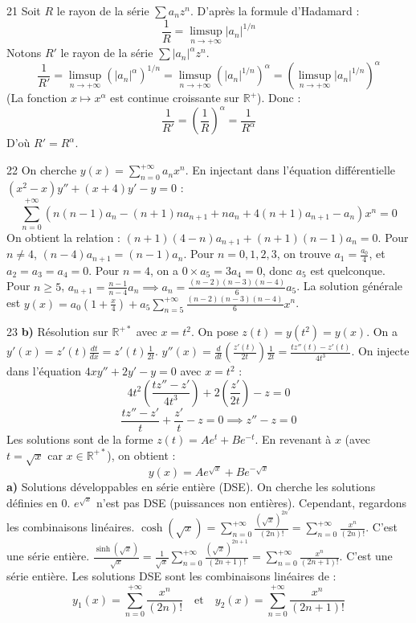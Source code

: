 \begin{correction}{21}
Soit $R$ le rayon de la série $\sum a_n z^n$. 
D'après la formule d'Hadamard :
$$ \frac{1}{R} = \limsup_{n \to +\infty} |a_n|^{1/n} $$ 
Notons $R'$ le rayon de la série $\sum |a_n|^\alpha z^n$. 
$$ \frac{1}{R'} = \limsup_{n \to +\infty} (|a_n|^\alpha)^{1/n} = \limsup_{n \to +\infty} (|a_n|^{1/n})^\alpha = \left( \limsup_{n \to +\infty} |a_n|^{1/n} \right)^\alpha $$ 
(La fonction $x \mapsto x^\alpha$ est continue croissante sur $\mathbb{R}^+$). 
Donc :
$$ \frac{1}{R'} = \left(\frac{1}{R}\right)^\alpha = \frac{1}{R^\alpha} $$ 
D'où $R' = R^\alpha$. 
\end{correction}

\begin{correction}{22}
On cherche $y(x) = \sum_{n=0}^{+\infty} a_n x^n$. 
En injectant dans l'équation différentielle $(x^2-x)y''+(x+4)y'-y=0$ : 
$$ \sum_{n=0}^{+\infty} \left( n(n-1)a_n - (n+1)na_{n+1} + na_n + 4(n+1)a_{n+1} - a_n \right) x^n = 0 $$ 
On obtient la relation : $(n+1)(4-n)a_{n+1} + (n+1)(n-1)a_n = 0$. 
Pour $n \neq 4$, $(n-4)a_{n+1} = (n-1)a_n$. 
Pour $n=0, 1, 2, 3$, on trouve $a_1 = \frac{a_0}{4}$, et $a_2 = a_3 = a_4 = 0$. 
Pour $n=4$, on a $0 \times a_5 = 3a_4 = 0$, donc $a_5$ est quelconque. 
Pour $n \ge 5$, $a_{n+1} = \frac{n-1}{n-4}a_n \implies a_n = \frac{(n-2)(n-3)(n-4)}{6} a_5$. 
La solution générale est $y(x) = a_0 \left(1 + \frac{x}{4}\right) + a_5 \sum_{n=5}^{+\infty} \frac{(n-2)(n-3)(n-4)}{6} x^n$. 
\end{correction}

\begin{correction}{23}
\textbf{b)} Résolution sur $\mathbb{R}^{+*}$ avec $x=t^2$. 
On pose $z(t) = y(t^2) = y(x)$. 
On a $y'(x) = z'(t) \frac{dt}{dx} = z'(t) \frac{1}{2t}$. 
$y''(x) = \frac{d}{dt}\left(\frac{z'(t)}{2t}\right) \frac{1}{2t} = \frac{t z''(t) - z'(t)}{4t^3}$. 
On injecte dans l'équation $4xy'' + 2y' - y = 0$ avec $x=t^2$ : 
$$ 4t^2 \left( \frac{t z'' - z'}{4t^3} \right) + 2 \left( \frac{z'}{2t} \right) - z = 0 $$ 
$$ \frac{t z'' - z'}{t} + \frac{z'}{t} - z = 0 \implies z'' - z = 0 $$ 
Les solutions sont de la forme $z(t) = A e^t + B e^{-t}$. 
En revenant à $x$ (avec $t = \sqrt{x}$ car $x \in \mathbb{R}^{+*}$), on obtient : 
$$ y(x) = A e^{\sqrt{x}} + B e^{-\sqrt{x}} $$ 
\textbf{a)} Solutions développables en série entière (DSE). 
On cherche les solutions définies en 0. 
$e^{\sqrt{x}}$ n'est pas DSE (puissances non entières). Cependant, regardons les combinaisons linéaires. 
$\cosh(\sqrt{x}) = \sum_{n=0}^{+\infty} \frac{(\sqrt{x})^{2n}}{(2n)!} = \sum_{n=0}^{+\infty} \frac{x^n}{(2n)!}$. C'est une série entière. 
$\frac{\sinh(\sqrt{x})}{\sqrt{x}} = \frac{1}{\sqrt{x}} \sum_{n=0}^{+\infty} \frac{(\sqrt{x})^{2n+1}}{(2n+1)!} = \sum_{n=0}^{+\infty} \frac{x^n}{(2n+1)!}$. C'est une série entière. 
Les solutions DSE sont les combinaisons linéaires de : 
$$ y_1(x) = \sum_{n=0}^{+\infty} \frac{x^n}{(2n)!} \quad \text{et} \quad y_2(x) = \sum_{n=0}^{+\infty} \frac{x^n}{(2n+1)!} $$ 
\end{correction}

